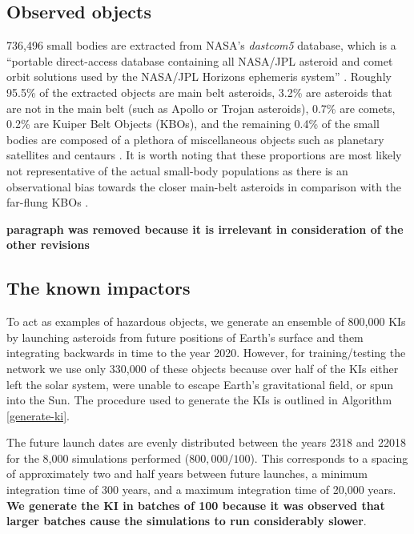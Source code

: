 \documentclass{aa}
\begin{document}
\subsection{Observed objects}
\label{SEC:RealAsteroids}
736,496 small bodies are extracted from NASA's \textit{dastcom5} database, which is a ``portable direct-access database containing all NASA/JPL asteroid and comet orbit solutions used by the NASA/JPL Horizons ephemeris system'' \citep{dastcom5}. Roughly 95.5\% of the extracted objects are main belt asteroids, 3.2\% are asteroids that are not in the main belt (such as Apollo or Trojan asteroids), 0.7\% are comets, 0.2\% are Kuiper Belt Objects (KBOs), and the remaining 0.4\% of the small bodies are composed of a plethora of miscellaneous objects such as planetary satellites and centaurs \citep{SolarSystemObjects}. It is worth noting that these proportions are most likely not representative of the actual small-body populations as there is an observational bias towards the closer main-belt asteroids in comparison with the far-flung KBOs \citep{KBO_Population}.

\textbf{paragraph was removed because it is irrelevant in consideration of the other revisions}
 

\subsection{The known impactors}

To act as examples of hazardous objects, we generate an ensemble of 800,000 KIs by launching asteroids from future positions of Earth's surface and them integrating backwards in time to the year 2020.
However, for training/testing the network we use only 330,000 of these objects because over half of the KIs either left the solar system, were unable to escape Earth's gravitational field, or spun into the Sun. The procedure used to generate the KIs is outlined in Algorithm \ref{generate-ki}.

The future launch dates are evenly distributed between the years 2318 and 22018 for the 8,000 simulations performed ($800,000/100$). This corresponds to a spacing of approximately two and half years between future launches, a minimum integration time of 300 years, and a maximum integration time of 20,000 years. \textbf{We generate the KI in batches of 100 because it was observed that larger batches cause the simulations to run considerably slower}.
 
\end{document}
